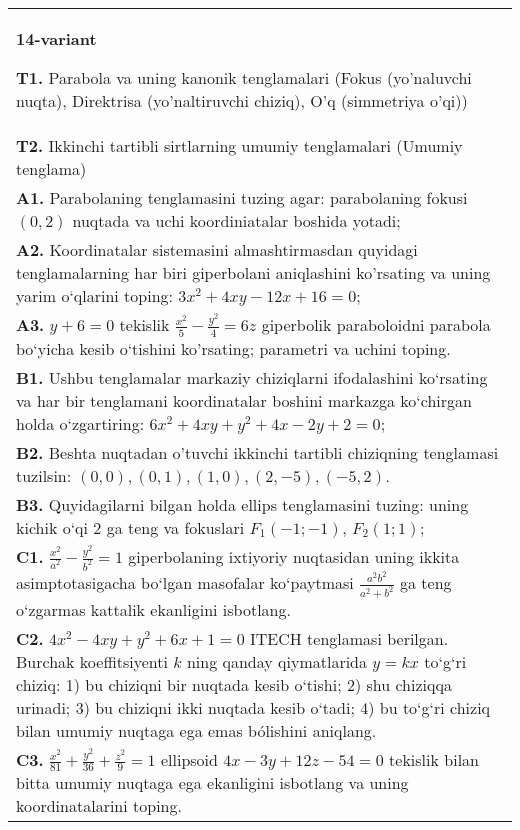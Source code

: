 \documentclass{article}
\begin{document}
\begin{tabular}{m{17cm}}
\textbf{14-variant}
\newline

\textbf{T1.} Parabola va uning kanonik tenglamalari (Fokus (yo’naluvchi nuqta), Direktrisa (yo’naltiruvchi chiziq), O’q (simmetriya o’qi)) \\
\textbf{T2.} Ikkinchi tartibli sirtlarning umumiy tenglamalari (Umumiy tenglama) \\
\textbf{A1.} Parabolaning tenglamasini tuzing agar: parabolaning fokusi $(0,2)$ nuqtada va uchi koordiniatalar boshida yotadi; \\
\textbf{A2.} Koordinatalar sistemasini almashtirmasdan quyidagi tenglamalarning har biri giperbolani aniqlashini ko'rsating va uning yarim o‘qlarini toping: $3 x^2+4 x y-12 x+16=0$; \\
\textbf{A3.} $y+6=0$ tekislik $\frac{x^2}{5}-\frac{y^2}{4}=6 z$ giperbolik paraboloidni parabola bo‘yicha kesib o‘tishini ko'rsating; parametri va uchini toping. \\
\textbf{B1.} Ushbu tenglamalar markaziy chiziqlarni ifodalashini ko‘rsating va har bir tenglamani koordinatalar boshini markazga ko‘chirgan holda o‘zgartiring: $6 x^2+4 x y+y^2+4 x-2 y+2=0$; \\
\textbf{B2.} Beshta nuqtadan o'tuvchi ikkinchi tartibli chiziqning tenglamasi tuzilsin: $(0,0),(0,1),(1,0),(2,-5),(-5,2)$. \\
\textbf{B3.} Quyidagilarni bilgan holda ellips tenglamasini tuzing: uning kichik o‘qi 2 ga teng va fokuslari $F_1 (-1;-1) $, $F_2 (1; 1) $; \\
\textbf{C1.} $\frac{x^2}{a^2}-\frac{y^2}{b^2}=1$ giperbolaning ixtiyoriy nuqtasidan uning ikkita asimptotasigacha bo‘lgan masofalar ko‘paytmasi $\frac{a^2 b^2}{a^2+b^2}$ ga teng o‘zgarmas kattalik ekanligini isbotlang. \\
\textbf{C2.} $4 x^2-4 x y+y^2+6 x+1=0$ ITECH tenglamasi berilgan. Burchak koeffitsiyenti $k$ ning qanday qiymatlarida $y=kx$ to‘g‘ri chiziq: 1) bu chiziqni bir nuqtada kesib o‘tishi; 2) shu chiziqqa urinadi; 3) bu chiziqni ikki nuqtada kesib o‘tadi; 4) bu to‘g‘ri chiziq bilan umumiy nuqtaga ega emas bólishini aniqlang. \\
\textbf{C3.} $\frac{x^2}{81}+\frac{y^2}{36}+\frac{z^2}{9}=1$ ellipsoid $4 x-3 y+12 z-54=0$ tekislik bilan bitta umumiy nuqtaga ega ekanligini isbotlang va uning koordinatalarini toping. \\

\end{tabular}
\vspace{1cm}
\end{document}
